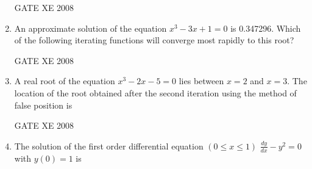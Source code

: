 \documentclass[12pt]{article}
\begin{document}
\begin{enumerate}
\begin{enumerate}
\end{enumerate}

GATE XE 2008
\item  An approximate solution of the equation $x^3 - 3x+1=0$ is 0.347296. Which of the following iterating functions will converge most rapidly to this root?

\begin{enumerate}
\end{enumerate}

GATE XE 2008
\item  A real root of the equation $x^3 -2x-5 =0$ lies between $x=2$ and $x = 3$. The location of the root obtained after the second iteration using the method of false position is

\begin{enumerate}
\end{enumerate}

GATE XE 2008
\item The solution of the first order differential equation $(0\leq x\leq1)$\newline
$\frac{dy}{dx} - y^2 =0$ with $y(0)=1$ is

\begin{enumerate}
\end{enumerate}


\end{enumerate}
\end{document}
